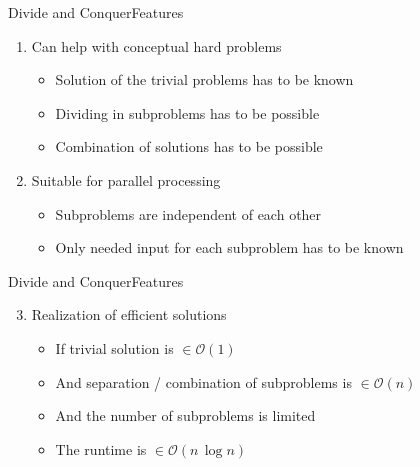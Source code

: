 

\begin{frame}{Divide and Conquer}{Features}
  \begin{enumerate}
    \item
      Can help with conceptual hard problems
      \begin{itemize}
        \item
          {\color{Mittel-Blau}Solution} of the trivial problems has to be known
        \item
          {\color{Mittel-Blau}Dividing} in subproblems has to be possible
        \item
          {\color{Mittel-Blau}Combination} of solutions has to be possible
      \end{itemize}
    \item
      Suitable for parallel processing
      \begin{itemize}
        \item
          Subproblems are {\color{Mittel-Blau}independent} of each other
        \item
          Only needed input for each subproblem has to be known
      \end{itemize}
  \end{enumerate}
\end{frame}


\begin{frame}{Divide and Conquer}{Features}
  \begin{enumerate}
    \setcounter{enumi}{2}
    \item
      Realization of {\color{Mittel-Blau}efficient solutions}
      \begin{itemize}
        \item
          If trivial solution is $\in \mathcal{O}(1)$
        \item
          And separation / combination of subproblems is $\in \mathcal{O}(n)$
        \item
          And the number of subproblems is limited
        \item
          The runtime is $\in \mathcal{O}(n \, \log n)$
      \end{itemize}
  \end{enumerate}
\end{frame}

